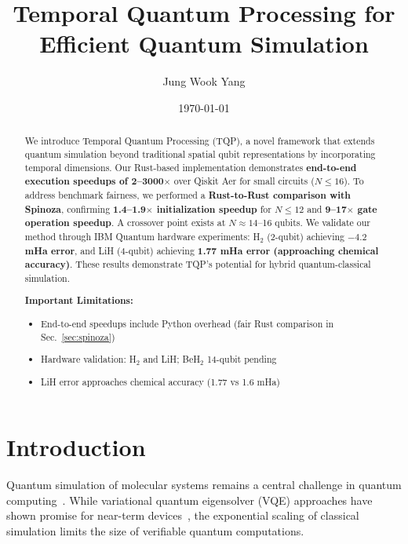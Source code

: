 \documentclass[aps,prx,twocolumn,superscriptaddress,floatfix]{revtex4-2}
\begin{document}
\title{Temporal Quantum Processing for Efficient Quantum Simulation}

\author{Jung Wook Yang}

\date{\today}

\begin{abstract}
We introduce Temporal Quantum Processing (TQP), a novel framework that extends quantum simulation beyond traditional spatial qubit representations by incorporating temporal dimensions. Our Rust-based implementation demonstrates \textbf{end-to-end execution speedups of 2--3000$\times$} over Qiskit Aer for small circuits ($N \le 16$). To address benchmark fairness, we performed a \textbf{Rust-to-Rust comparison with Spinoza}, confirming \textbf{1.4--1.9$\times$ initialization speedup} for $N \le 12$ and \textbf{9--17$\times$ gate operation speedup}. A crossover point exists at $N \approx 14$--16 qubits. We validate our method through IBM Quantum hardware experiments: H$_2$ (2-qubit) achieving \textbf{$-4.2$ mHa error}, and LiH (4-qubit) achieving \textbf{1.77 mHa error (approaching chemical accuracy)}. These results demonstrate TQP's potential for hybrid quantum-classical simulation.

\textbf{Important Limitations:}
\begin{itemize}
    \item End-to-end speedups include Python overhead (fair Rust comparison in Sec.~\ref{sec:spinoza})
    \item Hardware validation: H$_2$ and LiH; BeH$_2$ 14-qubit pending
    \item LiH error approaches chemical accuracy (1.77 vs 1.6 mHa)
\end{itemize}
\end{abstract}

\maketitle

\section{Introduction}

Quantum simulation of molecular systems remains a central challenge in quantum computing~\cite{peruzzo2014variational,cerezo2021variational}. While variational quantum eigensolver (VQE) approaches have shown promise for near-term devices~\cite{kandala2017hardware,omalley2016scalable}, the exponential scaling of classical simulation limits the size of verifiable quantum computations.
\end{document}
